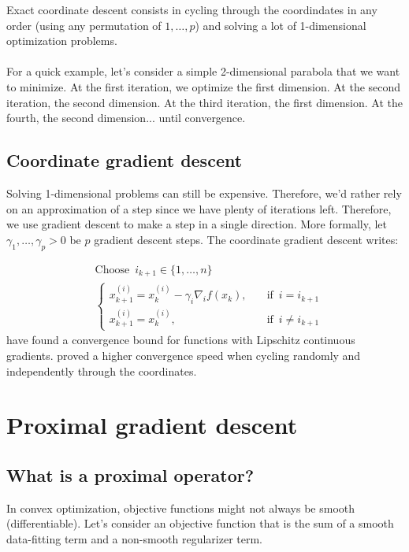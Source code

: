 \documentclass[a4paper,10pt]{article}
\theoremstyle{definition}
\begin{document}
Exact coordinate descent consists in cycling through the coordindates in any order
(using any permutation of $1, \dots, p$) and solving a lot of 1-dimensional optimization
problems.
\\
\\
For a quick example, let's consider a simple 2-dimensional parabola that we want to minimize.
At the first iteration, we optimize the first dimension. At the second iteration, the second dimension.
At the third iteration, the first dimension. At the fourth, the second dimension... until convergence.

\subsection*{Coordinate gradient descent}

Solving 1-dimensional problems can still be expensive. Therefore, we'd rather rely on an approximation of
a step since we have plenty of iterations left. Therefore, we use gradient descent to make a step in a single
direction. More formally, let $\gamma_1, \dots, \gamma_p > 0$ be $p$ gradient descent steps. The coordinate
gradient descent writes:

\begin{align*}
    &\text{Choose} \enspace i_{k+1} \in \{1, \dots, n\} \\
    &\begin{cases}
        x_{k+1}^{(i)} = x_{k}^{(i)} - \gamma_i \nabla_i f(x_k), \quad &\text{if} \enspace i = i_{k+1} \\
        x_{k+1}^{(i)} = x_{k}^{(i)}, \quad &\text{if} \enspace i \neq i_{k+1} 
    \end{cases}
\end{align*}
%
\cite{Beck_Tetruashvili13} have found a convergence bound for functions with Lipschitz continuous
gradients. \cite{Nesterov12} proved a higher convergence speed when cycling randomly and independently
through the coordinates.

\section*{Proximal gradient descent}

\subsection*{What is a proximal operator?}

In convex optimization, objective functions might not always be smooth (differentiable). Let's consider
an objective function that is the sum of a smooth data-fitting term and a non-smooth regularizer term.
\end{document}

